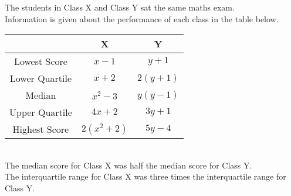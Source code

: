 \documentclass{exam}
\newenvironment{nscenter}
 {\parskip=0pt\par\nopagebreak\centering}
 {\par\noindent\ignorespacesafterend}
\begin{document}
\begin{questions}
    \newpage

    \question The students in Class X and Class Y sat the same maths exam.\\
    Information is given about the performance of each class in the table below.
    \begin{nscenter}
        \begin{tabular}{|c|c|c|}
            \hline
            & X & Y\\
            \hline
            Lowest Score & $x-1$ \phantom{1pt} & $y+1$ \phantom{1pt}\\
            \hline
            Lower Quartile & $x+2$ \phantom{1pt} & $2(y+1)$ \phantom{1pt}\\
            \hline
            Median & $x^2-3$ \phantom{1pt} & $y(y-1)$ \phantom{1pt}\\
            \hline
            Upper Quartile & $4x+2$ \phantom{1pt} & $3y+1$ \phantom{1pt}\\
            \hline
            Highest Score & $2(x^2+2)$ \phantom{1pt} & $5y-4$ \phantom{1pt}\\
            \hline
        \end{tabular}
    \end{nscenter}\\
    The median score for Class X was half the median score for Class Y.\\
    The interquartile range for Class X was three times the interquartile range for Class Y.\\


\end{questions}
\end{document}

